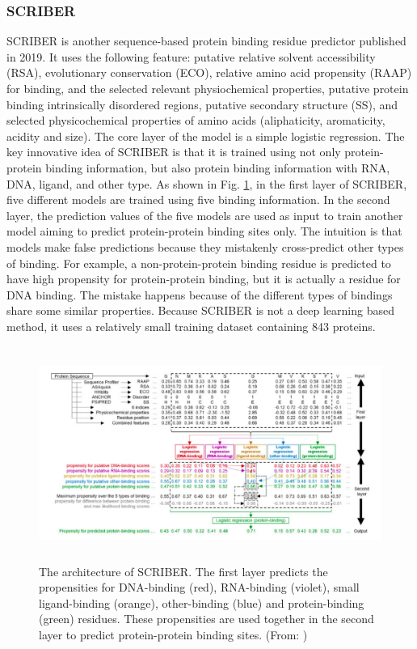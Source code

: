 \subsubsection{SCRIBER}
SCRIBER \cite{zhang2019scriber} is another sequence-based protein binding residue predictor published in 2019. It uses the following feature: putative relative solvent accessibility (RSA), evolutionary conservation (ECO), relative amino acid propensity (RAAP) for binding, and the selected relevant physiochemical properties, putative protein binding intrinsically disordered regions, putative secondary structure (SS), and selected physicochemical properties of amino acids (aliphaticity, aromaticity, acidity and size). The core layer of the model is a simple logistic regression. The key innovative idea of SCRIBER is that it is trained using not only protein-protein binding information, but also protein binding information with RNA, DNA, ligand, and other type. As shown in Fig. \ref{fig_SCRIBER}, in the first layer of SCRIBER, five different models are trained using five binding information. In the second layer, the prediction values of the five models are used as input to train another model aiming to predict protein-protein binding sites only. The intuition is that models make false predictions because they mistakenly cross-predict other types of binding. For example, a non-protein-protein binding residue is predicted to have high propensity for protein-protein binding, but it is actually a residue for DNA binding. The mistake happens because of the different types of bindings share some similar properties. Because SCRIBER is not a deep learning based method, it uses a relatively small training dataset containing 843 proteins.
\begin{figure}[h!]
\begin{center}
\includegraphics[height = 7cm]{img/SCRIBER.png}
\caption{The architecture of SCRIBER. The first layer predicts the propensities for DNA-binding (red), RNA-binding (violet), small ligand-binding (orange), other-binding (blue) and protein-binding (green) residues. These propensities are used together in the second layer to predict protein-protein binding sites. (From: \cite{zhang2019scriber})  \label{fig_SCRIBER}}
\end{center}
\end{figure} 
